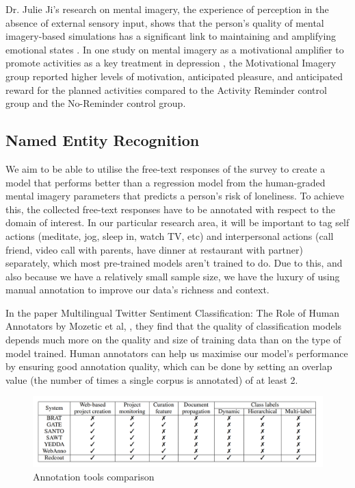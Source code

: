 \documentclass[12pt, a4paper]{article}
\begin{document}
Dr. Julie Ji's research on mental imagery, the experience of perception in the absence of external sensory input, shows that the person's quality of mental imagery-based simulations has a significant link to maintaining and amplifying emotional states \cite{conceptualandclinical}. In one study on mental imagery as a motivational amplifier to promote activities as a key treatment in depression \cite{motivationalamplifier}, the Motivational Imagery group reported higher levels of motivation, anticipated pleasure, and anticipated reward for the planned activities compared to the Activity Reminder control group and the No-Reminder control group.

\subsection{Named Entity Recognition}
We aim to be able to utilise the free-text responses of the survey to create a model that performs better than a regression model from the human-graded mental imagery parameters that predicts a person's risk of loneliness. To achieve this, the collected free-text responses have to be annotated with respect to the domain of interest. In our particular research area, it will be important to tag self actions (meditate, jog, sleep in, watch TV, etc) and interpersonal actions (call friend, video call with parents, have dinner at restaurant with partner) separately, which most pre-trained models aren't trained to do. Due to this, and also because we have a relatively small sample size, we have the luxury of using manual annotation to improve our data's richness and context.

In the paper Multilingual Twitter Sentiment Classification: The Role of Human Annotators by Mozetic et al, \cite{Mozeti__2016}, they find that the quality of classification models depends much more on the quality and size of training data than on the type of model trained. Human annotators can help us maximise our model's performance by ensuring good annotation quality, which can be done by setting an overlap value (the number of times a single corpus is annotated) of at least 2.


\begin{figure}
	\includegraphics[scale=0.25]{annotating_tools}
	\caption{Annotation tools comparison}
	\label{annot_table}
\end{figure}
\end{document}
